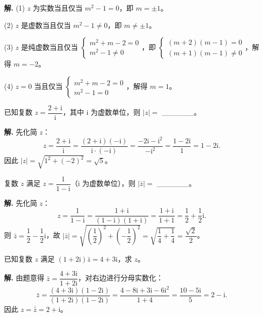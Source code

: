 \documentclass[11pt]{ctexrep}
\begin{document}
\textbf{解.} (1) $z$ 为实数当且仅当 $m^2 - 1 = 0$，即 $m = \pm 1$。

(2) $z$ 是虚数当且仅当 $m^2 - 1 \neq 0$，即 $m \neq \pm 1$。

(3) $z$ 是纯虚数当且仅当 $\begin{cases} m^2 + m - 2 = 0 \\ m^2 - 1 \neq 0 \end{cases}$，即 $\begin{cases} (m + 2)(m - 1) = 0 \\ (m + 1)(m - 1) \neq 0 \end{cases}$，解得 $m = -2$。

(4) $z = 0$ 当且仅当 $\begin{cases} m^2 + m - 2 = 0 \\ m^2 - 1 = 0 \end{cases}$，解得 $m = 1$。

\begin{realexam}[2025 上海春考]
    已知复数 $z = \dfrac{2 + \mathrm{i}}{\mathrm{i}}$，其中 $\mathrm{i}$ 为虚数单位，则 $|z| = $ \_\_\_\_\_\_。
\end{realexam}

\textbf{解.} 先化简 $z$：
\[
    z = \frac{2 + \mathrm{i}}{\mathrm{i}} = \frac{(2 + \mathrm{i})(-\mathrm{i})}{\mathrm{i} \cdot (-\mathrm{i})} = \frac{-2\mathrm{i} - \mathrm{i}^2}{-\mathrm{i}^2} = \frac{1 - 2\mathrm{i}}{1} = 1 - 2\mathrm{i}.
\]
因此 $|z| = \sqrt{1^2 + (-2)^2} = \sqrt{5}$。

\begin{realexam}[2024 长宁一模]
    复数 $z$ 满足 $z = \dfrac{1}{1 - \mathrm{i}}$（$\mathrm{i}$ 为虚数单位），则 $|\bar{z}| = $ \_\_\_\_\_\_。
\end{realexam}

\textbf{解.} 先化简 $z$：
\[
    z = \frac{1}{1 - \mathrm{i}} = \frac{1 + \mathrm{i}}{(1 - \mathrm{i})(1 + \mathrm{i})} = \frac{1 + \mathrm{i}}{1 + 1} = \frac{1}{2} + \frac{1}{2}\mathrm{i}.
\]
则 $\bar{z} = \dfrac{1}{2} - \dfrac{1}{2}\mathrm{i}$，故 $|\bar{z}| = \sqrt{\left(\dfrac{1}{2}\right)^2 + \left(-\dfrac{1}{2}\right)^2} = \sqrt{\dfrac{1}{4} + \dfrac{1}{4}} = \dfrac{\sqrt{2}}{2}$。

\begin{example}[复数方程求解]
    已知复数 $z$ 满足 $(1 + 2\mathrm{i})\bar{z} = 4 + 3\mathrm{i}$，求 $z$。
\end{example}

\textbf{解.} 由题意得 $\bar{z} = \dfrac{4 + 3\mathrm{i}}{1 + 2\mathrm{i}}$，对右边进行分母实数化：
\[
    \bar{z} = \frac{(4 + 3\mathrm{i})(1 - 2\mathrm{i})}{(1 + 2\mathrm{i})(1 - 2\mathrm{i})} = \frac{4 - 8\mathrm{i} + 3\mathrm{i} - 6\mathrm{i}^2}{1 + 4} = \frac{10 - 5\mathrm{i}}{5} = 2 - \mathrm{i}.
\]
因此 $z = \overline{\bar{z}} = 2 + \mathrm{i}$。
\end{document}
